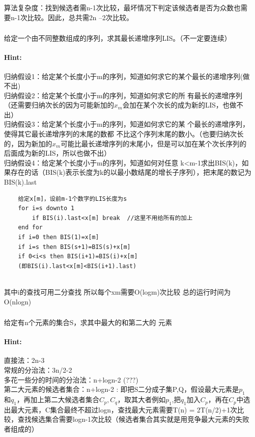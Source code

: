\documentclass{article}
\begin{document}
        算法复杂度：找到候选者需n-1次比较，最坏情况下判定该候选者是否为众数也需要n-1次比较。因此，总共需2n –2次比较。

     
     \subsubsection{}给定一个由不同整数组成的序列，求其最长递增序列LIS。（不一定要连续）
     \paragraph{Hint:}归纳假设1：给定某个长度小于m的序列，知道如何求它的某个最长的递增序列(做不出)\\
归纳假设2：给定某个长度小于m的序列，知道如何求它的所
有最长的递增序列（还需要归纳次长的因为可能新加的$x_m$会加在某个次长的成为新的LIS，也做不出）\\
归纳假设3：给定某个长度小于m的序列，知道如何求它的某
个最长的递增序列，使得其它最长递增序列的末尾的数都
不比这个序列末尾的数小。（也要归纳次长的，因为新加的$x_m$可能比最长递增序列的末尾小，但是可以加在某个次长序列的后面成为新的LIS，所以也做不出）\\
归纳假设4：给定某个长度小于m的序列，知道如何对任意
k<m-1求出BIS(k)，如果存在的话（BIS(k)表示长度为k的以最小数结尾的增长子序列），把末尾的数记为BIS(k).last\\

\lstset{language=C}
    \begin{lstlisting}
    给定x[m]，设前m-1个数字的LIS长度为s
    for i=s downto 1 
        if BIS(i).last<x[m] break  //这里不用给所有的加上 
    end for
    if i=0 then BIS(1)=x[m]
    if i=s then BIS(s+1)=BIS(s)+x[m]
    if 0<i<s then BIS(i+1)=BIS(i)+x[m]
    (即BIS(i).last<x[m]<BIS(i+1).last)
    
    \end{lstlisting}
    其中i的查找可用二分查找
所以每个xm需要O(logm)次比较
总的运行时间为O(nlogn)




     \subsubsection{}给定有n个元素的集合S，求其中最大的和第二大的
元素
     \paragraph{Hint:}直接法：2n-3\\
    常规的分治法：3n/2-2\\
    多花一些分的时间的分治法：n+logn-2 (???) \\
    第二大元素的候选者集合：n+logn-2 : 即把S二分成子集P,Q，假设最大元素是$p_1$和$q_1$，再加上第二大候选者集合$C_p,C_q$，取其大者例如$p_1$,把$q_1$加入$C_p$，再在$C_p$中选出最大元素，C集合最终不超过logn，查找最大元素需要T(n) = 2T(n/2)+1次比较，查找候选集合需要logn-1次比较（候选者集合其实就是用竞争最大元素的失败者组成的）\\
     
\end{document}
